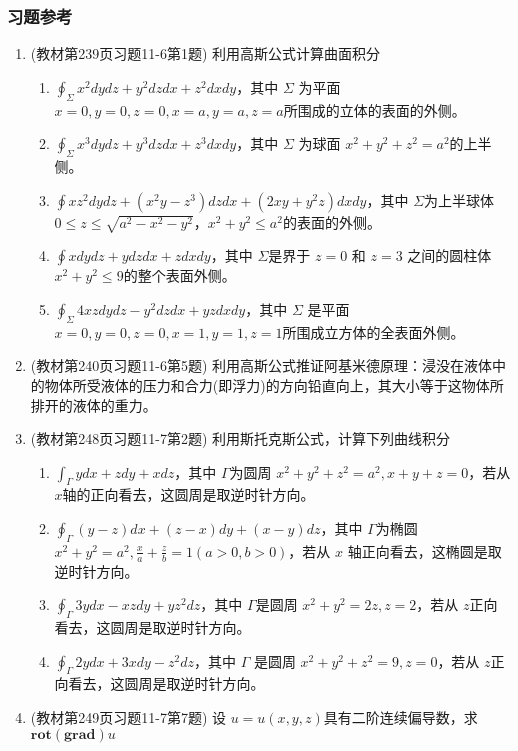 \subsubsection{习题参考}
\begin{enumerate}
    \item (教材第239页习题11-6第1题) 利用高斯公式计算曲面积分
        \begin{enumerate}[(1)]
            \item $\oint _\Sigma x^2dydz + y^2dzdx + z^2 dxdy$，其中 $\Sigma$ 为平面 $x=0,y=0,z=0,x=a,y=a,z=a$所围成的立体的表面的外侧。
    
            \item $\oint _\Sigma x^3 dydz + y^3 dzdx + z^3 dxdy$，其中 $\Sigma$ 为球面 $x^2 + y^2 + z^2 =a^2$的上半侧。
    
            \item $\oint xz^2 dydz + (x^2y - z^3)dzdx + (2xy + y^2z)dxdy$，其中 $\Sigma $为上半球体 $0 \le z \le \sqrt{a^2 -x^2 -y^2}$，$x^2 + y^2 \le a^2$的表面的外侧。
    
            \item $\oint xdydz + ydzdx + zdxdy$，其中 $\Sigma$是界于 $z=0$ 和 $z=3$ 之间的圆柱体 $x^2 + y^2 \le 9$的整个表面外侧。
    
            \item $\oint _\Sigma 4xzdydz - y^2dzdx + yz dxdy$，其中 $\Sigma$ 是平面 $x=0,y=0,z=0,x=1,y=1,z=1$所围成立方体的全表面外侧。
        \end{enumerate}

    \item (教材第240页习题11-6第5题) 利用高斯公式推证阿基米德原理：浸没在液体中的物体所受液体的压力和合力(即浮力)的方向铅直向上，其大小等于这物体所排开的液体的重力。

    \item (教材第248页习题11-7第2题) 利用斯托克斯公式，计算下列曲线积分
        \begin{enumerate}[(1)]
            \item $\int _\Gamma y dx + zdy + xdz$，其中 $\Gamma$为圆周 $x^2 + y^2 + z^2 = a^2, x + y + z =0$，若从 $x$轴的正向看去，这圆周是取逆时针方向。
    
            \item $\oint _\Gamma (y-z)dx + (z-x)dy + (x-y)dz$，其中 $\Gamma$为椭圆 $x^2 + y^2 =a^2, \frac{x}{a} + \frac{z}{b} =1 (a>0, b>0)$，若从 $x$ 轴正向看去，这椭圆是取逆时针方向。
    
            \item $\oint _\Gamma 3ydx -xzdy + yz^2dz$，其中 $\Gamma$是圆周 $x^2 + y^2 =2z, z=2$，若从 $z$正向看去，这圆周是取逆时针方向。
    
            \item $\oint _\Gamma 2ydx + 3xdy -z^2dz$，其中 $\Gamma$ 是圆周 $x^2 + y^2 + z^2 =9,z=0$，若从 $z$正向看去，这圆周是取逆时针方向。
        \end{enumerate}

    \item (教材第249页习题11-7第7题) 设 $u = u(x,y,z)$具有二阶连续偏导数，求 $\mathbf{rot(grad )}u$
\end{enumerate}